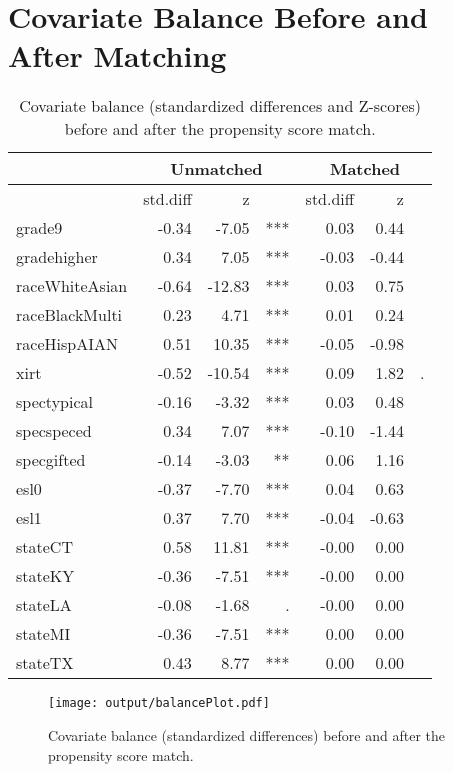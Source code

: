 \documentclass{article}\usepackage[]{graphicx}\usepackage[]{color}
\begin{document}
\section{Covariate Balance Before and After Matching}
\begin{table}[ht]
\centering
\begin{tabular}{lrrrrrr}
  &\multicolumn{3}{c}{Unmatched}&\multicolumn{3}{c}{Matched}\\
 \hline
 & std.diff & z &  & std.diff & z &  \\ 
  \hline
grade9 & -0.34 & -7.05 & *** & 0.03 & 0.44 &     \\ 
  gradehigher & 0.34 & 7.05 & *** & -0.03 & -0.44 &     \\ 
  raceWhiteAsian & -0.64 & -12.83 & *** & 0.03 & 0.75 &     \\ 
  raceBlackMulti & 0.23 & 4.71 & *** & 0.01 & 0.24 &     \\ 
  raceHispAIAN & 0.51 & 10.35 & *** & -0.05 & -0.98 &     \\ 
  xirt & -0.52 & -10.54 & *** & 0.09 & 1.82 & .   \\ 
  spectypical & -0.16 & -3.32 & *** & 0.03 & 0.48 &     \\ 
  specspeced & 0.34 & 7.07 & *** & -0.10 & -1.44 &     \\ 
  specgifted & -0.14 & -3.03 & **  & 0.06 & 1.16 &     \\ 
  esl0 & -0.37 & -7.70 & *** & 0.04 & 0.63 &     \\ 
  esl1 & 0.37 & 7.70 & *** & -0.04 & -0.63 &     \\ 
  stateCT & 0.58 & 11.81 & *** & -0.00 & 0.00 &     \\ 
  stateKY & -0.36 & -7.51 & *** & -0.00 & 0.00 &     \\ 
  stateLA & -0.08 & -1.68 & .   & -0.00 & 0.00 &     \\ 
  stateMI & -0.36 & -7.51 & *** & 0.00 & 0.00 &     \\ 
  stateTX & 0.43 & 8.77 & *** & 0.00 & 0.00 &     \\ 
   \hline
\end{tabular}
\caption{Covariate balance (standardized differences and Z-scores) before and after the propensity score match.} 
\label{tab:balance}
\end{table}


\begin{figure}[!h]
\centering
\texttt{[image: output/balancePlot.pdf]}
\caption{Covariate balance (standardized differences) before and after
  the propensity score match.}
\label{fig:balance}
\end{figure}
\end{document}

